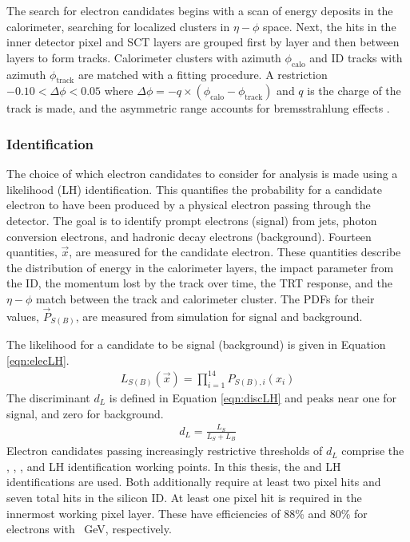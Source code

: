 The search for electron candidates begins with a scan of energy deposits in the calorimeter, searching for localized clusters in $\eta-\phi$ space.
Next, the hits in the inner detector pixel and SCT layers are grouped first by layer and then between layers to form tracks.
Calorimeter clusters with azimuth $\phi_\text{calo}$ and ID tracks with azimuth $\phi_\text{track}$ are matched with a fitting procedure.
A restriction $-0.10<\Delta\phi<0.05$ where $\Delta\phi=-q\times(\phi_\text{calo}-\phi_\text{track})$ and $q$ is the charge of the track is made, and the asymmetric range accounts for bremsstrahlung effects \cite{elecReco}.

\subsubsection{Identification}

The choice of which electron candidates to consider for analysis is made using a likelihood (LH) identification.
This quantifies the probability for a candidate electron to have been produced by a physical electron passing through the detector.
The goal is to identify prompt electrons (signal) from jets, photon conversion electrons, and hadronic decay electrons (background).
Fourteen quantities, $\vec{x}$, are measured for the candidate electron.
These quantities describe the distribution of energy in the calorimeter layers, the impact parameter from the ID, the momentum lost by the track over time, the TRT response, and the $\eta-\phi$ match between the track and calorimeter cluster.
The PDFs for their values, $\vec{P}_{S(B)}$, are measured from simulation for signal and background.


The likelihood for a candidate to be signal (background) is given in Equation \ref{eqn:elecLH}.
\begin{equation}\begin{split}\label{eqn:elecLH}
L_{S(B)}(\vec{x}) = \prod_{i=1}^{14}P_{S(B),i}(x_i)
\end{split}\end{equation}
The discriminant $d_L$ is defined in Equation \ref{eqn:discLH} and peaks near one for signal, and zero for background.
\begin{equation}\begin{split}\label{eqn:discLH}
d_L=\frac{L_S}{L_S+L_B}
\end{split}\end{equation} 
Electron candidates passing increasingly restrictive thresholds of $d_L$ comprise the , , , and  LH identification working points.
In this thesis, the  and  LH identifications are used.
Both additionally require at least two pixel hits and seven total hits in the silicon ID.
At least one pixel hit is required in the innermost working pixel layer.
These have efficiencies of 88\% and 80\% for electrons with ~GeV, respectively.

